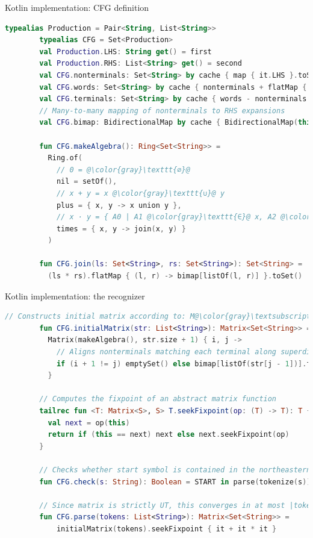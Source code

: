 \documentclass{beamer}
\begin{document}
    \begin{frame}[fragile]{Kotlin implementation: CFG definition}
        \begin{lstlisting}[language=Kotlin, gobble=8, basicstyle=\scriptsize\ttfamily]
        typealias Production = Pair<String, List<String>>
        typealias CFG = Set<Production>
        val Production.LHS: String get() = first
        val Production.RHS: List<String> get() = second
        val CFG.nonterminals: Set<String> by cache { map { it.LHS }.toSet() }
        val CFG.words: Set<String> by cache { nonterminals + flatMap { it.RHS } }
        val CFG.terminals: Set<String> by cache { words - nonterminals }
        // Many-to-many mapping of nonterminals to RHS expansions
        val CFG.bimap: BidirectionalMap by cache { BidirectionalMap(this) }

        fun CFG.makeAlgebra(): Ring<Set<String>> =
          Ring.of(
            // 0 = @\color{gray}\texttt{∅}@
            nil = setOf(),
            // x + y = x @\color{gray}\texttt{∪}@ y
            plus = { x, y -> x union y },
            // x · y = { A0 | A1 @\color{gray}\texttt{∈}@ x, A2 @\color{gray}\texttt{∈}@ y, (A0 -> A1 A2) @\color{gray}\texttt{∈}@ P }
            times = { x, y -> join(x, y) }
          )

        fun CFG.join(ls: Set<String>, rs: Set<String>): Set<String> =
          (ls * rs).flatMap { (l, r) -> bimap[listOf(l, r)] }.toSet()
        \end{lstlisting}
    \end{frame}

    \begin{frame}[fragile]{Kotlin implementation: the recognizer}
        \begin{lstlisting}[language=Kotlin, gobble=8, basicstyle=\scriptsize\ttfamily]
        // Constructs initial matrix according to: M@\color{gray}\textsubscript{i+1=j}@ = { A | (A -> @\color{gray}\texttt{σ}\textsubscript{i}@) @\color{gray}\texttt{∈}@ P }
        fun CFG.initialMatrix(str: List<String>): Matrix<Set<String>> =
          Matrix(makeAlgebra(), str.size + 1) { i, j ->
            // Aligns nonterminals matching each terminal along superdiagonal
            if (i + 1 != j) emptySet() else bimap[listOf(str[j - 1])].toSet()
          }

        // Computes the fixpoint of an abstract matrix function
        tailrec fun <T: Matrix<S>, S> T.seekFixpoint(op: (T) -> T): T {
          val next = op(this)
          return if (this == next) next else next.seekFixpoint(op)
        }

        // Checks whether start symbol is contained in the northeasternmost entry
        fun CFG.check(s: String): Boolean = START in parse(tokenize(s))[0].last()

        // Since matrix is strictly UT, this converges in at most |tokens| steps
        fun CFG.parse(tokens: List<String>): Matrix<Set<String>> =
            initialMatrix(tokens).seekFixpoint { it + it * it }
        \end{lstlisting}
    \end{frame}
\end{document}
